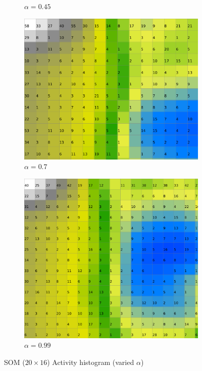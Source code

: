 \documentclass{acm_proc_article-sp}
\begin{document}
\begin{figure}
\begin{subfigure}[b]{0.24\linewidth}
        \caption{$\alpha=0.45$}
        \label{fig:wine-20x16-activity-histogram-alpha-0,45}
    \end{subfigure}
    \begin{subfigure}[b]{0.24\linewidth}
        \includegraphics[width=\linewidth]{img/wine-20x16-activity-histogram-alpha-0,7}
        \caption{$\alpha=0.7$}
        \label{fig:wine-20x16-activity-histogram-alpha-0,7}
    \end{subfigure}
    \begin{subfigure}[b]{0.24\linewidth}
        \includegraphics[width=\linewidth]{img/wine-20x16-activity-histogram-alpha-0,99}
        \caption{$\alpha=0.99$}
        \label{fig:wine-20x16-activity-histogram-alpha-0,99}
    \end{subfigure}
    \caption{SOM ($20\times16$) Activity histogram (varied $\alpha$)}
    \label{fig:wine-20x16-activity-histogram-alpha}
\end{figure}
\end{document}
